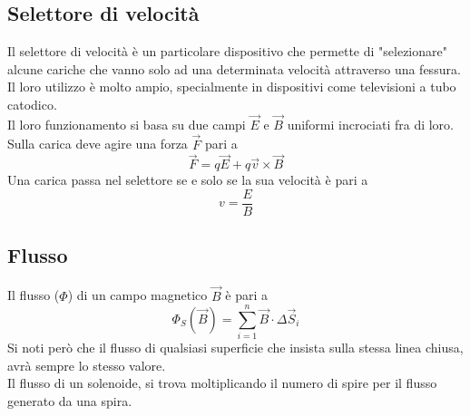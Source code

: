 \subsection{Selettore di velocità}
Il selettore di velocità è un particolare dispositivo che permette di "selezionare" alcune cariche che
vanno solo ad una determinata velocità attraverso una fessura. Il loro utilizzo è molto ampio, 
specialmente in dispositivi come televisioni a tubo catodico.\\
Il loro funzionamento si basa su due campi $\vec{E}$ e $\vec{B}$ uniformi incrociati fra di loro.\\
Sulla carica deve agire una forza $\vec{F}$ pari a
\begin{equation*}
  \vec{F} = q\vec{E} + q\vec{v}\times\vec{B}
\end{equation*}
Una carica passa nel selettore se e solo se la sua velocità è pari a
\begin{equation*}
  v = \frac{E}{B}
\end{equation*}

\subsection{Flusso}
Il flusso ($\Phi$) di un campo magnetico $\vec{B}$ è pari a 
\begin{equation*}
  \Phi_S(\vec{B}) = \sum^n_{i=1} \vec{B}\cdot\Delta\vec{S}_i
\end{equation*}
Si noti però che il flusso di qualsiasi superficie che insista sulla stessa linea chiusa, avrà
sempre lo stesso valore.\\
Il flusso di un solenoide, si trova moltiplicando il numero di spire per il flusso generato da una
spira.

